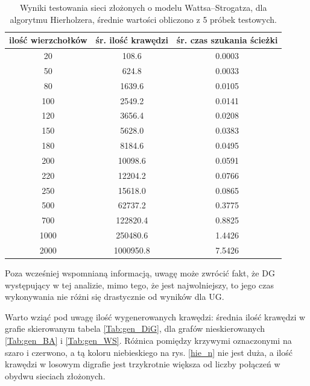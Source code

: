 \documentclass[a4paper, 12pt, twoside, openright]{article}
\begin{document}
\begin{table}[H]
	\centering
	\caption{Wyniki testowania sieci złożonych o modelu Wattsa–Strogatza, dla algorytmu Hierholzera, średnie wartości obliczono z 5 próbek testowych.}
	\resizebox{14.5cm}{!}
	{
	\begin{tabular}{|c c c|}
		\hline
		ilość wierzchołków	& śr. ilość krawędzi 		& śr. czas szukania ścieżki\\ \hline \hline
		20 	& 108.6  		& 0.0003 	\\ \hline
		50 	& 624.8 		& 0.0033 	\\ \hline
		80 	& 1639.6        & 0.0105	\\ \hline
		100 & 2549.2        & 0.0141	\\ \hline
		120 & 3656.4        & 0.0208	\\ \hline
		150 & 5628.0   		& 0.0383	\\ \hline
		180 & 8184.6        & 0.0495	\\ \hline
		200 & 10098.6 		& 0.0591	\\ \hline
		220 & 12204.2 		& 0.0766	\\ \hline
		250 & 15618.0 		& 0.0865	\\ \hline
		500 & 62737.2 		& 0.3775	\\ \hline				
		700 & 122820.4      & 0.8825	\\ \hline
		1000& 250480.6	    & 1.4426 	\\ \hline
		2000& 1000950.8    	& 7.5426	\\ \hline
	\end{tabular} 
	}
	\label{Tab:Hie_WS}
\end{table}

	Poza wcześniej wspomnianą informacją, uwagę może zwrócić fakt, że DG występujący w tej analizie, mimo tego, że jest najwolniejszy, to jego czas wykonywania nie różni się drastycznie od wyników dla UG. 
	
	Warto wziąć pod uwagę ilość wygenerowanych krawędzi: średnia ilość krawędzi w grafie skierowanym tabela \ref{Tab:gen_DiG}, dla grafów nieskierowanych \ref{Tab:gen_BA} i \ref{Tab:gen_WS}. Różnica pomiędzy krzywymi oznaczonymi na szaro i czerwono, a tą koloru niebieskiego na rys. \ref{hie_n} nie jest duża, a ilość krawędzi w losowym digrafie jest trzykrotnie większa od liczby połączeń w obydwu sieciach złożonych.
\end{document}

